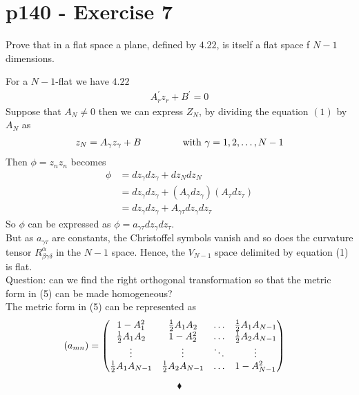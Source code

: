 \section{p140 - Exercise 7}
\begin{tcolorbox}
Prove that in a flat space a plane, defined by $\mathbf{4.22}$, is itself a flat space f $N-1$ dimensions.
\end{tcolorbox}
For a $N-1$-flat we have $\mathbf{4.22}$
\begin{align}
A^{'}_r z_r+B^{'}=0
\end{align}
Suppose that $A_N \ne 0$ then we can express $Z_N$, by dividing the equation $(1)$ by $A_N$ as 
\begin{align}
z_N = A_{\gamma} z_{\gamma}+B \quad\quad\quad\quad \text{ with } \gamma = 1,2, \dots, N-1
\end{align}
Then $\phi = z_nz_n$ becomes
\begin{align}
\phi &= d z_{\gamma}dz_{\gamma}+ dz_N dz_N\\
&=d z_{\gamma}dz_{\gamma} + \left(A_{\gamma} dz_{\gamma}\right)\left(A_{\tau} dz_{\tau}\right)\\
&=d z_{\gamma}dz_{\gamma} + A_{\gamma \tau} dz_{\gamma} dz_{\tau}
\end{align}
So $\phi$ can be expressed as $\phi = a_{\gamma \tau}dz_{\gamma}dz_{\tau}$.\\
But as $a_{\gamma \tau}$ are constants, the Christoffel symbols vanish and so does the curvature tensor $R^{\alpha}_{\beta \gamma \delta}$ in the $N-1$ space. Hence, the $V_{N-1}$ space delimited by equation (1) is flat.\\
Question: can we find the right orthogonal transformation so that the metric form in (5) can be made homogeneous?\\
The metric form in (5) can be represented as
\begin{align}
\left(a_{mn}\right) &= \begin{pmatrix}
 1-A_1^2& \frac{1}{2} A_1A_{2} & \dots &  \frac{1}{2} A_1A_{N-1}\\
 \frac{1}{2} A_1A_{2}&  1-A_2^2&  \dots& \frac{1}{2} A_2A_{N-1}\\
 \vdots& \vdots &  \ddots& \vdots\\
 \frac{1}{2} A_1A_{N-1}&\frac{1}{2} A_2A_{N-1}  & \dots & 1-A_{N-1}^2 \\
\end{pmatrix}
\end{align}

$$\blacklozenge$$
\newpage

